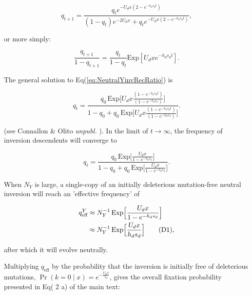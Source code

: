 \documentclass{article}
\newcommand\hl[1]{%
  \bgroup
  \hskip0pt\color{blue!80!black}%
  #1%
  \egroup
}
\newcommand\numberthis{\addtocounter{equation}{1}\tag{\theequation}}
\begin{document}
\begin{equation}\label{eq:NeutralYinvRec}
	q_{t+1} = \frac{ q_t e^{-U_d x(2 - e^{-h_d s_d t})} }{(1 - q_t) e^{-2 U_d x} + q_t e^{-U_d x(2 - e^{-h_d s_d t})}},
\end{equation} 

\noindent or more simply:

\begin{equation}\label{eq:NeutralYinvRecRatio}
	\frac{q_{t+1}}{1- q_{t+1}} = \frac{q_{t}}{1- q_{t}} \text{Exp}[U_d x e^{-h_d s_d t}].
\end{equation} 

\noindent The general solution to Eq(\ref{eq:NeutralYinvRecRatio}) is 

\begin{equation}\label{eq:NeutralYinvGenSol}
	q_{t} = \frac{q_{0} \, \text{Exp}\Bigg[ U_d x \frac{(1 - e^{-h_d s_d t})}{(1 - e^{-h_d s_d})} \Bigg]} {1 - q_{0} + q_0 \, \text{Exp}\Bigg[ U_d x \frac{(1 - e^{-h_d s_d t})}{(1 - e^{-h_d s_d})} \Bigg]}.
\end{equation} 

\noindent (see \hl{Connallon \& Olito {\itshape unpubl.}}). In the limit of $t \rightarrow \infty$, the frequency of inversion descendents will converge to 

\begin{equation}\label{eq:NeutralYinvGenSolLimit}
	q_{t} = \frac{q_{0} \, \text{Exp}\Big[ \frac{U_d x}{1 - e^{-h_d s_d} } \Big]} {1 - q_{0} + q_0 \, \text{Exp}\Big[ \frac{U_d x}{1 - e^{-h_d s_d} } \Big]}.
\end{equation} 

\noindent When $N_Y$ is large, a single-copy of an initially deleterious mutation-free neutral inversion will reach an 'effective frequency' of

\begin{align*}\label{eq:NeutralYinvQEff}
	q^Y_{\text{eff}} & \approx N^{-1}_Y \, \text{Exp}\Big[ \frac{U_d x}{1 - e^{-h_d s_d} } \Big] \\
	 &\approx N^{-1}_Y \, \text{Exp}\Big[ \frac{U_d x}{h_d s_d} \Big] \numberthis,
\end{align*} 

\noindent after which it will evolve neutrally. 

Multiplying $q_{\text{eff}}$ by the probability that the inversion is initially free of deleterious mutations, $\Pr(k = 0 \mid x) = e^{-\frac{U_d x}{s_d}}$, gives the overall fixation probability presented in Eq(\hl{2}a) of the main text:
\end{document}
